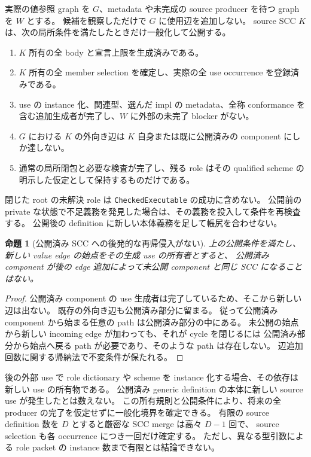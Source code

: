 \documentclass[11pt,a4paper]{article}
\newtheorem{theorem}{命題}[section]
\theoremstyle{remark}
\begin{document}
実際の値参照 graph を $G$、metadata や未完成の source producer を待つ graph を $W$ とする。
候補を観察しただけで $G$ に使用辺を追加しない。
source SCC $K$ は、次の局所条件を満たしたときだけ一般化して公開する。
\begin{enumerate}
\item $K$ 所有の全 body と宣言上限を生成済みである。
\item $K$ 所有の全 member selection を確定し、実際の全 use occurrence を登録済みである。
\item use の instance 化、関連型、選んだ impl の metadata、全称 conformance を含む追加生成者が完了し、$W$ に外部の未完了 blocker がない。
\item $G$ における $K$ の外向き辺は $K$ 自身または既に公開済みの component にしか達しない。
\item 通常の局所閉包と必要な検査が完了し、残る role はその qualified scheme の明示した仮定として保持するものだけである。
\end{enumerate}

閉じた root の未解決 role は \texttt{CheckedExecutable} の成功に含めない。
公開前の private な状態で不足義務を発見した場合は、その義務を投入して条件を再検査する。
公開後の definition に新しい本体義務を足して帳尻を合わせない。

\begin{theorem}[公開済み SCC への後発的な再帰侵入がない]
上の公開条件を満たし、新しい value edge の始点をその生成 use の所有者とすると、
公開済み component が後の edge 追加によって未公開 component と同じ SCC になることはない。
\end{theorem}
\begin{proof}
公開済み component の use 生成者は完了しているため、そこから新しい辺は出ない。
既存の外向き辺も公開済み部分に留まる。
従って公開済み component から始まる任意の path は公開済み部分の中にある。
未公開の始点から新しい incoming edge が加わっても、それが cycle を閉じるには
公開済み部分から始点へ戻る path が必要であり、そのような path は存在しない。
辺追加回数に関する帰納法で不変条件が保たれる。
\end{proof}

後の外部 use で role dictionary や scheme を instance 化する場合、その依存は新しい use の所有物である。
公開済み generic definition の本体に新しい source use が発生したとは数えない。
この所有規則と公開条件により、将来の全 producer の完了を仮定せずに一般化境界を確定できる。
有限の source definition 数を $D$ とすると厳密な SCC merge は高々 $D-1$ 回で、
source selection も各 occurrence につき一回だけ確定する。
ただし、異なる型引数による role packet の instance 数まで有限とは結論できない。
\end{document}
